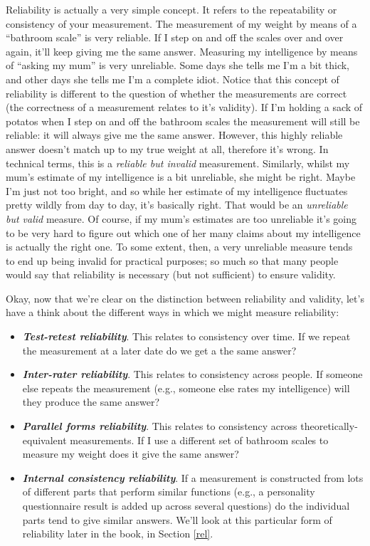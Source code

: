 \documentclass[
]{book}
\providecommand{\tightlist}{%
  \setlength{\itemsep}{0pt}\setlength{\parskip}{0pt}}
\begin{document}
Reliability is actually a very simple concept. It refers to the repeatability or consistency of your measurement. The measurement of my weight by means of a ``bathroom scale'' is very reliable. If I step on and off the scales over and over again, it'll keep giving me the same answer. Measuring my intelligence by means of ``asking my mum'' is very unreliable. Some days she tells me I'm a bit thick, and other days she tells me I'm a complete idiot. Notice that this concept of reliability is different to the question of whether the measurements are correct (the correctness of a measurement relates to it's validity). If I'm holding a sack of potatos when I step on and off the bathroom scales the measurement will still be reliable: it will always give me the same answer. However, this highly reliable answer doesn't match up to my true weight at all, therefore it's wrong. In technical terms, this is a \emph{reliable but invalid} measurement. Similarly, whilst my mum's estimate of my intelligence is a bit unreliable, she might be right. Maybe I'm just not too bright, and so while her estimate of my intelligence fluctuates pretty wildly from day to day, it's basically right. That would be an \emph{unreliable but valid} measure. Of course, if my mum's estimates are too unreliable it's going to be very hard to figure out which one of her many claims about my intelligence is actually the right one. To some extent, then, a very unreliable measure tends to end up being invalid for practical purposes; so much so that many people would say that reliability is necessary (but not sufficient) to ensure validity.

Okay, now that we're clear on the distinction between reliability and validity, let's have a think about the different ways in which we might measure reliability:

\begin{itemize}
\tightlist
\item
  \textbf{\emph{Test-retest reliability}}. This relates to consistency over time. If we repeat the measurement at a later date do we get a the same answer?
\item
  \textbf{\emph{Inter-rater reliability}}. This relates to consistency across people. If someone else repeats the measurement (e.g., someone else rates my intelligence) will they produce the same answer?
\item
  \textbf{\emph{Parallel forms reliability}}. This relates to consistency across theoretically-equivalent measurements. If I use a different set of bathroom scales to measure my weight does it give the same answer?
\item
  \textbf{\emph{Internal consistency reliability}}. If a measurement is constructed from lots of different parts that perform similar functions (e.g., a personality questionnaire result is added up across several questions) do the individual parts tend to give similar answers. We'll look at this particular form of reliability later in the book, in Section \ref{rel}.
\end{itemize}
\end{document}
